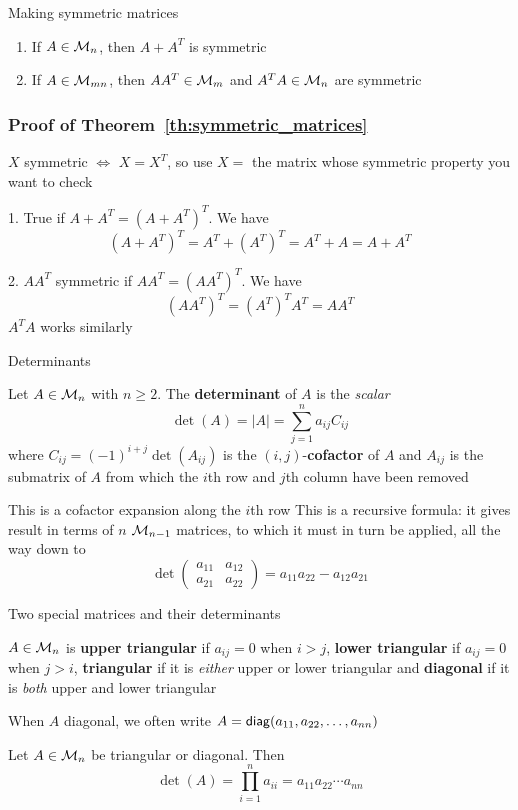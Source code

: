 \documentclass[aspectratio=169]{beamer}\usepackage[]{graphicx}\usepackage[]{xcolor}
\begin{document}
\begin{frame}{Making symmetric matrices}
\begin{importanttheorem}\label{th:symmetric_matrices}
\begin{enumerate}
	\item If $A\in\mathcal{M}_n$, then $A+A^T$ is symmetric
	\item If $A\in\mathcal{M}_{mn}$, then $AA^T\in\mathcal{M}_m$ and $A^TA\in\mathcal{M}_n$ are symmetric
\end{enumerate}
\end{importanttheorem}
\end{frame}

\begin{frame}[red]
\frametitle{Proof of Theorem~\ref{th:symmetric_matrices}}
$X$ symmetric $\iff$ $X=X^T$, so use $X=$ the matrix whose symmetric property you want to check

1. True if $A+A^T=(A+A^T)^T$. We have 
\[
(A+A^T)^T=A^T+(A^T)^T=A^T+A=A+A^T
\]

2. $AA^T$ symmetric if $AA^T=(AA^T)^T$. We have 
\[
(AA^T)^T=(A^T)^TA^T=AA^T
\]
$A^TA$ works similarly
\end{frame}

\begin{frame}{Determinants}
\begin{definition}[Determinant]
Let $A\in\mathcal{M}_n$ with $n\geq 2$. The \textbf{determinant} of $A$ is the \emph{scalar}
\[
\det(A)=|A|=\sum_{j=1}^na_{ij}C_{ij}
\]
where $C_{ij}=(-1)^{i+j}\det(A_{ij})$ is the $(i,j)$-\textbf{cofactor} of $A$ and $A_{ij}$ is the submatrix of $A$ from which the $i$th row and $j$th column have been removed
\end{definition}
This is a cofactor expansion along the $i$th row
\vfill
This is a recursive formula: it gives result in terms of $n$ $\mathcal{M}_{n-1}$ matrices, to which it must in turn be applied, all the way down to
\[
\det\left(
\begin{matrix}
a_{11} & a_{12} \\ a_{21} & a_{22}
\end{matrix}\right) = a_{11}a_{22}-a_{12}a_{21}
\]
\end{frame}

\begin{frame}{Two special matrices and their determinants}
\begin{definition}
$A\in\mathcal{M}_n$ is \textbf{upper triangular} if $a_{ij}=0$ when $i>j$, \textbf{lower triangular} if $a_{ij}=0$ when $j>i$, \textbf{triangular} if it is \emph{either} upper or lower triangular and \textbf{diagonal} if it is \emph{both} upper and lower triangular
\end{definition}
When $A$ diagonal, we often write $A=\mathsf{diag}(a_{11},a_{22},\ldots,a_{nn})$
\begin{importanttheorem}
Let $A\in\mathcal{M}_n$ be triangular or diagonal. Then
\[
\det(A)=\prod_{i=1}^n a_{ii}=a_{11}a_{22}\cdots a_{nn}
\]
\end{importanttheorem}
\end{frame}
\end{document}
